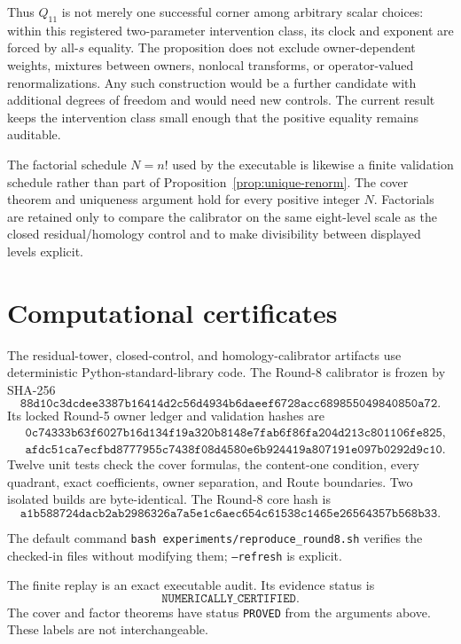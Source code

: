 \documentclass[11pt]{article}
\theoremstyle{definition}
\theoremstyle{remark}
\begin{document}
Thus $Q_{11}$ is not merely one successful corner among arbitrary scalar choices: within this registered two-parameter intervention class, its clock and exponent are forced by all-$s$ equality. The proposition does not exclude owner-dependent weights, mixtures between owners, nonlocal transforms, or operator-valued renormalizations. Any such construction would be a further candidate with additional degrees of freedom and would need new controls. The current result keeps the intervention class small enough that the positive equality remains auditable.

The factorial schedule $N=n!$ used by the executable is likewise a finite validation schedule rather than part of Proposition~\ref{prop:unique-renorm}. The cover theorem and uniqueness argument hold for every positive integer $N$. Factorials are retained only to compare the calibrator on the same eight-level scale as the closed residual/homology control and to make divisibility between displayed levels explicit.

\section{Computational certificates}

The residual-tower, closed-control, and homology-calibrator artifacts use deterministic Python-standard-library code. The Round-8 calibrator is frozen by SHA-256
\[
\texttt{88d10c3dcdee3387b16414d2c56d4934b6daeef6728acc689855049840850a72}.
\]
Its locked Round-5 owner ledger and validation hashes are
\begin{align*}
&\texttt{0c74333b63f6027b16d134f19a320b8148e7fab6f86fa204d213c801106fe825},\\
&\texttt{afdc51ca7ecfbd8777955c7438f08d4580e6b924419a807191e097b0292d9c10}.
\end{align*}
Twelve unit tests check the cover formulas, the content-one condition, every quadrant, exact coefficients, owner separation, and Route boundaries. Two isolated builds are byte-identical. The Round-8 core hash is
\[
\texttt{a1b588724dacb2ab2986326a7a5e1c6aec654c61538c1465e26564357b568b33}.
\]

The default command \texttt{bash experiments/reproduce\_round8.sh} verifies the checked-in files without modifying them; \texttt{--refresh} is explicit.

The finite replay is an exact executable audit. Its evidence status is
\[
\texttt{NUMERICALLY\_CERTIFIED}.
\]
The cover and factor theorems have status \texttt{PROVED} from the arguments above. These labels are not interchangeable.
\end{document}
